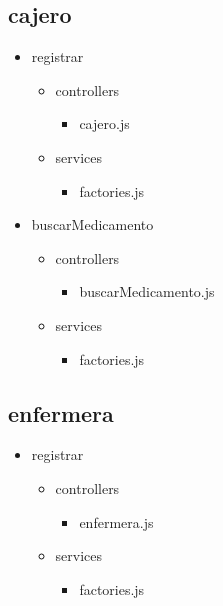 	\subsection{cajero}
	\begin{itemize}
		\item registrar
		\begin{itemize}
			\item controllers
			\begin{itemize}
				\item cajero.js
			\end{itemize}
			\item services
			\begin{itemize}
				\item factories.js
			\end{itemize}
		\end{itemize}
		\item buscarMedicamento
		\begin{itemize}
		\item controllers
		\begin{itemize}
		\item buscarMedicamento.js
		\end{itemize}
		\item services
		\begin{itemize}
		\item factories.js
		\end{itemize}
		\end{itemize}
	\end{itemize}
	\subsection{enfermera}
		\begin{itemize}
		\item registrar
		\begin{itemize}
			\item controllers
			\begin{itemize}
				\item enfermera.js
			\end{itemize}
			\item services
			\begin{itemize}
				\item factories.js
			\end{itemize}
		\end{itemize}
	\end{itemize}
